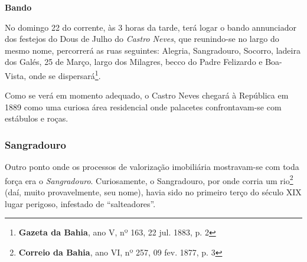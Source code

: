 \begin{citacao}
\textbf{Bando}

No domingo 22 do corrente, às 3 horas da tarde, terá logar o bando annunciador dos festejos do Dous de Julho do \textit{Castro Neves}, que reunindo-se no largo do mesmo nome, percorrerá as ruas seguintes: Alegria, Sangradouro, Socorro, ladeira dos Galés, 25 de Março, largo dos Milagres, becco do Padre Felizardo e Boa-Vista, onde se dispersará\footnote{\textbf{Gazeta da Bahia}, ano V, nº 163, 22 jul. 1883, p. 2}.
\end{citacao}

Como se verá em momento adequado, o Castro Neves chegará à República em 1889 como uma curiosa área residencial onde palacetes confrontavam-se com estábulos e roças.

\subsubsection{Sangradouro}\label{subsubsec:sangradouro}

Outro ponto onde os processos de valorização imobiliária mostravam-se com toda força era o \textit{Sangradouro}. Curiosamente, o Sangradouro, por onde corria um rio\footnote{\textbf{Correio da Bahia}, ano VI, nº 257, 09 fev. 1877, p. 3} (daí, muito provavelmente, seu nome), havia sido no primeiro terço do século XIX lugar perigoso, infestado de ``salteadores''.

